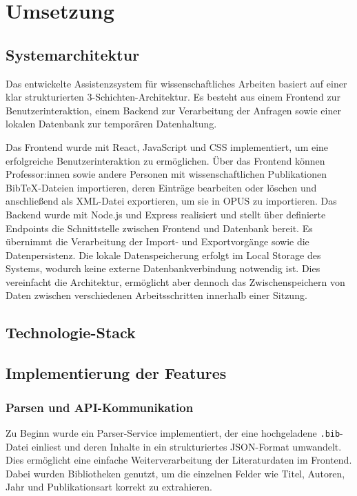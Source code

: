 \chapter{Umsetzung}

\section{Systemarchitektur}
Das entwickelte Assistenzsystem für wissenschaftliches Arbeiten basiert auf einer klar strukturierten 3-Schichten-Architektur. 
Es besteht aus einem Frontend zur Benutzerinteraktion, einem Backend zur Verarbeitung der Anfragen sowie einer lokalen Datenbank 
zur temporären Datenhaltung.

Das Frontend wurde mit React, JavaScript und CSS implementiert, um eine erfolgreiche Benutzerinteraktion zu ermöglichen. 
Über das Frontend können Professor:innen sowie andere Personen mit wissenschaftlichen Publikationen BibTeX-Dateien importieren, 
deren Einträge bearbeiten oder löschen und anschließend als XML-Datei exportieren, um sie in OPUS zu importieren. Das Backend 
wurde mit Node.js und Express realisiert und stellt über definierte Endpoints die Schnittstelle zwischen Frontend und Datenbank 
bereit. Es übernimmt die Verarbeitung der Import- und Exportvorgänge sowie die Datenpersistenz. Die lokale Datenspeicherung 
erfolgt im Local Storage des Systems, wodurch keine externe Datenbankverbindung notwendig ist. Dies vereinfacht die Architektur, 
ermöglicht aber dennoch das Zwischenspeichern von Daten zwischen verschiedenen Arbeitsschritten innerhalb einer Sitzung.

\section{Technologie-Stack}


\section{Implementierung der Features}

\subsection{Parsen und API-Kommunikation}
Zu Beginn wurde ein Parser-Service implementiert, der eine hochgeladene \texttt{.bib}-Datei einliest 
und deren Inhalte in ein strukturiertes JSON-Format umwandelt. Dies ermöglicht eine einfache Weiterverarbeitung 
der Literaturdaten im Frontend. Dabei wurden Bibliotheken genutzt, um die einzelnen Felder wie Titel, Autoren, Jahr
und Publikationsart korrekt zu extrahieren.

